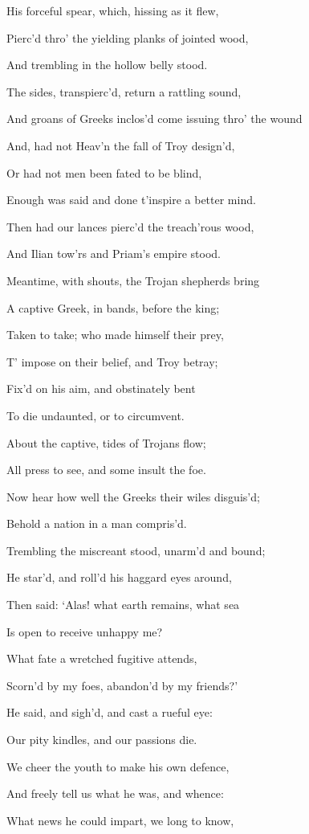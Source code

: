 His forceful spear, which, hissing as it flew,

Pierc’d thro’ the yielding planks of jointed wood,

And trembling in the hollow belly stood.

The sides, transpierc’d, return a rattling sound,

And groans of Greeks inclos’d come issuing thro’ the wound

And, had not Heav’n the fall of Troy design’d,

Or had not men been fated to be blind,

Enough was said and done t’inspire a better mind.

Then had our lances pierc’d the treach’rous wood,

And Ilian tow’rs and Priam’s empire stood.

Meantime, with shouts, the Trojan shepherds bring

A captive Greek, in bands, before the king;

Taken to take; who made himself their prey,

T’ impose on their belief, and Troy betray;

Fix’d on his aim, and obstinately bent

To die undaunted, or to circumvent.

About the captive, tides of Trojans flow;

All press to see, and some insult the foe.

Now hear how well the Greeks their wiles disguis’d;

Behold a nation in a man compris’d.

Trembling the miscreant stood, unarm’d and bound;

He star’d, and roll’d his haggard eyes around,

Then said: ‘Alas! what earth remains, what sea

Is open to receive unhappy me?

What fate a wretched fugitive attends,

Scorn’d by my foes, abandon’d by my friends?’

He said, and sigh’d, and cast a rueful eye:

Our pity kindles, and our passions die.

We cheer the youth to make his own defence,

And freely tell us what he was, and whence:

What news he could impart, we long to know,

